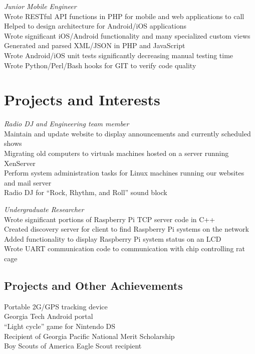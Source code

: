 \documentclass[line, margin]{resume}
\begin{document}
\textit{Junior Mobile Engineer} \\
Wrote RESTful API functions in PHP for mobile and web applications to call \\
Helped to design architecture for Android/iOS applications \\
Wrote significant iOS/Android functionality and many specialized custom views \\
Generated and parsed XML/JSON in PHP and JavaScript \\
Wrote Android/iOS unit tests significantly decreasing manual testing time \\
Wrote Python/Perl/Bash hooks for GIT to verify code quality

\section{Projects and Interests}
\textit{Radio DJ and Engineering team member} \\
Maintain and update website to display announcements and currently scheduled shows \\
Migrating old computers to virtuals machines hosted on a server running XenServer \\
Perform system administration tasks for Linux machines running our websites and mail server \\
Radio DJ for ``Rock, Rhythm, and Roll'' sound block

\textit{Undergraduate Researcher} \\
Wrote significant portions of Raspberry Pi TCP server code in C++\\
Created discovery server for client to find Raspberry Pi systems on the network \\
Added functionality to display Raspberry Pi system status on an LCD \\
Wrote UART communication code to communication with chip controlling rat cage \\

\subsection{Projects and Other Achievements}
Portable 2G/GPS tracking device \\
Georgia Tech Android portal \\
``Light cycle'' game for Nintendo DS \\
Recipient of Georgia Pacific National Merit Scholarship \\
Boy Scouts of America Eagle Scout recipient
\end{document}
